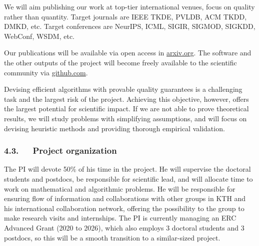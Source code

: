 \documentclass[a4paper,11pt]{article}
\begin{document}
We will aim publishing our work at top-tier international venues, 
focus on quality rather than quantity.
% 
Target journals 
are IEEE TKDE, PVLDB, ACM TKDD,  DMKD, etc. 
Target conferences are NeurIPS, ICML, SIGIR, SIGMOD, SIGKDD, WebConf, WSDM, etc.

Our publications will be available via open access in {\small\url{arxiv.org}}. 
The software and the other outputs of the project 
will become freely available to the scientific community via {\small\url{github.com}}.

Devising efficient algorithms with provable quality guarantees is a challenging task
and the largest risk of the project. 
Achieving this objective, however, offers the largest potential for scientific impact.
If we are not able to prove theoretical results, 
we will study problems with simplifying assumptions, and 
will focus on devising heuristic methods and providing thorough empirical validation.

\subsubsection*{4.3.~~~Project organization}
\vspace{-1mm}


The PI will devote 50\% of his time in the project. 
He will supervise the doctoral students and postdocs, 
be responsible for scientific lead, 
and will allocate time to work on mathematical and algorithmic problems.
He will be responsible for ensuring flow of information and collaborations
with other groups in KTH and his international collaboration network, 
offering the possibility to the group to make research visits and internships.
The PI is currently managing an ERC Advanced Grant (2020 to 2026),
which also employs 3 doctoral students and 3 postdocs, 
so this will be a smooth transition to a similar-sized project.
\end{document}
